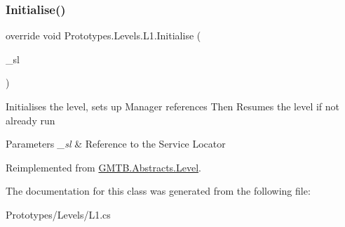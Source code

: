 \subsubsection{\texorpdfstring{Initialise()}{Initialise()}}
{\footnotesize\ttfamily override void Prototypes.\+Levels.\+L1.\+Initialise (\begin{DoxyParamCaption}\item[{\mbox{\hyperlink{interface_g_m_t_b_1_1_interfaces_1_1_i_service_locator}{I\+Service\+Locator}}}]{\+\_\+sl }\end{DoxyParamCaption})\hspace{0.3cm}{\ttfamily [virtual]}}



Initialises the level, sets up Manager references Then Resumes the level if not already run 


\begin{DoxyParams}{Parameters}
{\em \+\_\+sl} & Reference to the Service Locator \\
\hline
\end{DoxyParams}


Reimplemented from \mbox{\hyperlink{class_g_m_t_b_1_1_abstracts_1_1_level_a0048401bb0fb66b0fb0c19b3b25e4265}{G\+M\+T\+B.\+Abstracts.\+Level}}.



The documentation for this class was generated from the following file\+:\begin{DoxyCompactItemize}
\item 
Prototypes/\+Levels/L1.\+cs\end{DoxyCompactItemize}
